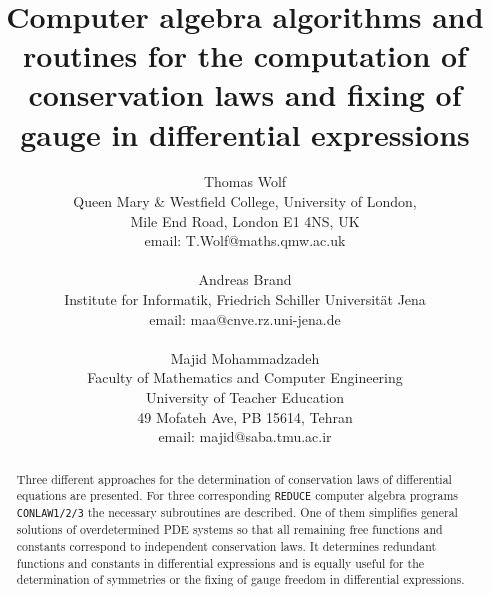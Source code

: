 \topmargin -25mm %
\textheight 25.5cm  



\title{\mbox{\quad} \\ \mbox{\quad} \\  \mbox{\quad} \\  \mbox{\quad} \\ 
       Computer algebra algorithms and routines for the
       computation of conservation laws and fixing of gauge
       in differential expressions}

\author{Thomas Wolf\\ Queen Mary \& Westfield College, University of London, \\
     Mile End Road, London E1 4NS, UK \\  email: T.Wolf@maths.qmw.ac.uk \\ \\
     Andreas Brand\\ Institute for Informatik, Friedrich Schiller
     Universit\"{a}t Jena\\ email: maa@cnve.rz.uni-jena.de \\ \\
     Majid Mohammadzadeh \\ Faculty of Mathematics and Computer
     Engineering \\ University of Teacher Education \\
     49 Mofateh Ave, PB 15614, Tehran \\
     email: majid@saba.tmu.ac.ir
     }


\maketitle
\begin{abstract}
Three different approaches for the determination of conservation
laws of differential equations are presented.
For three corresponding {\tt REDUCE} computer algebra programs 
{\tt CONLAW1/2/3} the necessary subroutines
are described. One of them simplifies general solutions of overdetermined
PDE systems so that all remaining free functions and constants
correspond to independent conservation laws.
It determines redundant functions and constants in differential expressions
and is equally useful for the determination of symmetries or the
fixing of gauge freedom in differential expressions.
\end{abstract}

